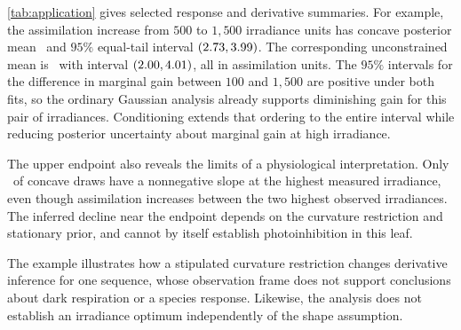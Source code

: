 \cref{tab:application} gives selected response and derivative summaries.
For example, the assimilation increase from $500$ to $1{,}500$
irradiance units has concave posterior mean \AppGainMean\ and
$95\%$ equal-tail interval $(2.73,3.99)$.
The corresponding unconstrained mean is \OrdGainMean\ with interval
$(2.00,4.01)$, all in assimilation units.
The $95\%$ intervals for the difference in marginal gain between $100$
and $1{,}500$ are positive under both fits, so the ordinary Gaussian
analysis already supports diminishing gain for this pair of irradiances.
Conditioning extends that ordering to the entire interval while reducing
posterior uncertainty about marginal gain at high irradiance.
\begin{table}[htbp]
\centering
\small

\caption[Response and marginal-gain summaries]{Posterior means with
pointwise $95\%$ equal-tail credible intervals for the leaf light-response
model in \cref{eq:application-model}, with arguments measured in
$\mu\mathrm{mol}$ quanta $\mathrm m^{-2}\mathrm s^{-1}$.
Response values and their differences have units
$\mu\mathrm{mol}$ $\mathrm{CO}_2$ $\mathrm m^{-2}\mathrm s^{-1}$,
while derivatives and their difference have units mol $\mathrm{CO}_2$
per mol quanta. Both columns use the same covariance and noise
estimates, with the concave column additionally conditioning on
nonpositive curvature throughout the observed range.}
\label{tab:application}
\end{table}

The upper endpoint also reveals the limits of a physiological
interpretation. Only \AppEndpointPercent\ of concave draws have a
nonnegative slope at the highest measured irradiance, even though
assimilation increases between the two highest observed irradiances.
The inferred decline near the endpoint depends on the curvature
restriction and stationary prior, and cannot by itself establish
photoinhibition in this leaf.

The example illustrates how a stipulated curvature restriction changes
derivative inference for one sequence, whose observation frame does
not support conclusions about dark respiration or a species response.
Likewise, the analysis does not establish an irradiance optimum
independently of the shape assumption.
